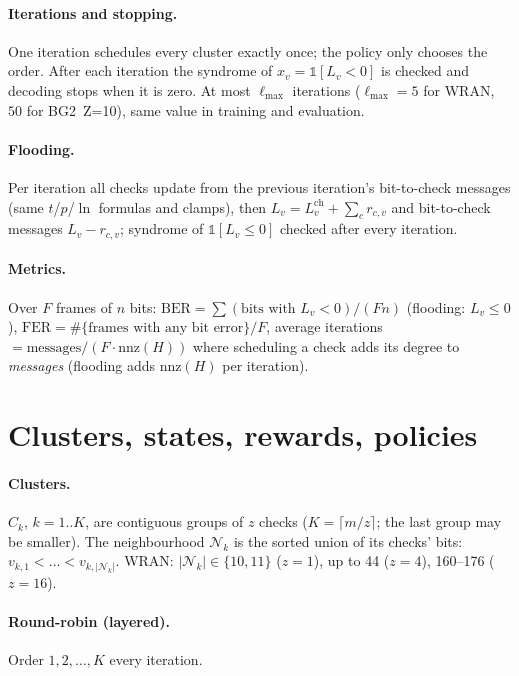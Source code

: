 \documentclass[10pt,a4paper]{article}
\newcommand{\Lch}{L^{\mathrm{ch}}}
\begin{document}
\paragraph{Iterations and stopping.} One iteration schedules every cluster exactly once; the policy only chooses the order.
After each iteration the syndrome of $\hat x_v=\mathbb 1[L_v<0]$ is checked and decoding stops when it is zero. At most
$\ell_{\max}$ iterations ($\ell_{\max}=5$ for WRAN, $50$ for BG2~Z=10), same value in training and evaluation.

\paragraph{Flooding.} Per iteration all checks update from the previous iteration's bit-to-check messages
(same $t$/$p$/$\ln$ formulas and clamps), then $L_v=\Lch_v+\sum_c r_{c,v}$ and bit-to-check messages $L_v-r_{c,v}$;
syndrome of $\mathbb 1[L_v\le 0]$ checked after every iteration.

\paragraph{Metrics.} Over $F$ frames of $n$ bits: $\mathrm{BER}=\sum(\text{bits with }L_v<0)/(Fn)$ (flooding: $L_v\le 0$),
$\mathrm{FER}=\#\{\text{frames with any bit error}\}/F$, average iterations $=\text{messages}/(F\cdot\mathrm{nnz}(H))$ where scheduling a check adds its degree to \emph{messages} (flooding adds $\mathrm{nnz}(H)$ per iteration).

\section{Clusters, states, rewards, policies}
\paragraph{Clusters.} $C_k$, $k=1..K$, are contiguous groups of $z$ checks ($K=\lceil m/z\rceil$; the last group may be smaller). The neighbourhood $\mathcal N_k$ is the sorted union of its checks' bits: $v_{k,1}<\dots<v_{k,|\mathcal N_k|}$. WRAN: $|\mathcal N_k|\in\{10,11\}$ ($z=1$), up to 44 ($z=4$), 160--176 ($z=16$).

\paragraph{Round-robin (layered).} Order $1,2,\dots,K$ every iteration.
\end{document}
